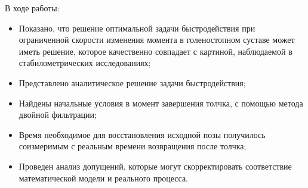 \documentclass[10pt]{beamer}
\begin{document}
\begin{frame}
	В ходе работы:
	\begin{itemize}
		\item Показано, что решение оптимальной задачи быстродействия при ограниченной
		      скорости изменения момента в голеностопном суставе может иметь решение, которое качественно совпадает с картиной, наблюдаемой в стабилометрических исследованиях;
		\item Представлено аналитическое решение задачи быстродействия;
		\item Найдены начальные условия в момент завершения толчка, с помощью метода двойной фильтрации;
		\item Время необходимое для восстановления исходной позы получилось
		      соизмеримым с реальным времени возвращения после толчка;
		\item Проведен анализ допущений, которые могут скорректировать соответствие математической модели и реального процесса.
	\end{itemize}
\end{frame}
\begin{frame}
\end{frame}
\end{document}
